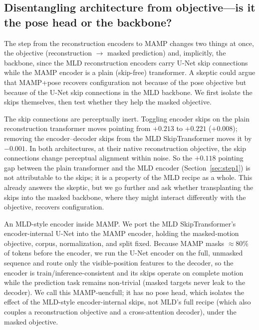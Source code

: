 \documentclass[letterpaper]{article} %
\begin{document}
\subsection{Disentangling architecture from objective---is it the pose head or the backbone?}
\label{sec:skip-ablation}
The step from the reconstruction encoders to MAMP changes {two} things at once, the
{objective} (reconstruction $\to$ masked prediction) and, implicitly, the {backbone},
since the MLD reconstruction encoders carry U-Net skip connections while the MAMP encoder is a
plain (skip-free) transformer. A skeptic could argue that MAMP+pose recovers configuration not
because of the pose {objective} but because of the U-Net skip connections in the MLD backbone.
We first isolate the skips themselves, then test whether they help the masked objective.

{The skip connections are perceptually inert.} Toggling encoder skips on the plain reconstruction
transformer moves pointing from $+0.213$ to $+0.221$ ($+0.008$); removing the encoder--decoder skips
from the MLD SkipTransformer moves it by $-0.001$. In both architectures, at their native
reconstruction objective, the skip connections change perceptual alignment within noise. So the
$+0.118$ pointing gap between the plain transformer and the MLD encoder (Section~\ref{sec:step1}) is {not}
attributable to the skips; it is a property of the MLD recipe as a whole. This already answers the
skeptic, but we go further and ask whether transplanting the skips into the {masked} backbone,
where they might interact differently with the objective, recovers configuration.

{An MLD-style encoder inside MAMP.} We port the MLD SkipTransformer's {encoder-internal}
U-Net into the MAMP encoder, holding the masked-motion objective, corpus, normalization, and split
fixed. Because MAMP masks $\approx$80\% of tokens before the encoder, we run the U-Net encoder on
the {full, unmasked} sequence and route only the visible-position features to the decoder,
so the encoder is train/inference-consistent and its skips operate on complete motion while the
prediction task remains non-trivial (masked targets never leak to the decoder). We call this
{MAMP-uencfull}; it has {no pose head}, which isolates the effect of the
MLD-style {encoder-internal skips}, not MLD's full recipe (which also couples a
reconstruction objective and a cross-attention decoder), under the masked objective.
\end{document}
